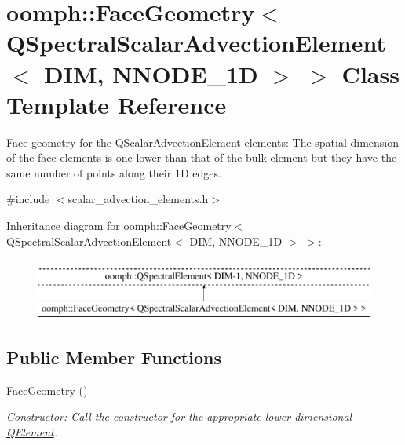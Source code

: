 \hypertarget{classoomph_1_1FaceGeometry_3_01QSpectralScalarAdvectionElement_3_01DIM_00_01NNODE__1D_01_4_01_4}{}\section{oomph\+:\+:Face\+Geometry$<$ Q\+Spectral\+Scalar\+Advection\+Element$<$ D\+IM, N\+N\+O\+D\+E\+\_\+1D $>$ $>$ Class Template Reference}
\label{classoomph_1_1FaceGeometry_3_01QSpectralScalarAdvectionElement_3_01DIM_00_01NNODE__1D_01_4_01_4}


Face geometry for the \hyperlink{classoomph_1_1QScalarAdvectionElement}{Q\+Scalar\+Advection\+Element} elements\+: The spatial dimension of the face elements is one lower than that of the bulk element but they have the same number of points along their 1D edges.  




{\ttfamily \#include $<$scalar\+\_\+advection\+\_\+elements.\+h$>$}

Inheritance diagram for oomph\+:\+:Face\+Geometry$<$ Q\+Spectral\+Scalar\+Advection\+Element$<$ D\+IM, N\+N\+O\+D\+E\+\_\+1D $>$ $>$\+:\begin{figure}[H]
\begin{center}
\leavevmode
\includegraphics[height=2.000000cm]{classoomph_1_1FaceGeometry_3_01QSpectralScalarAdvectionElement_3_01DIM_00_01NNODE__1D_01_4_01_4}
\end{center}
\end{figure}
\subsection*{Public Member Functions}
\begin{DoxyCompactItemize}
\item 
\hyperlink{classoomph_1_1FaceGeometry_3_01QSpectralScalarAdvectionElement_3_01DIM_00_01NNODE__1D_01_4_01_4_a2a40a86785381e67e1e5af8e1bbdc194}{Face\+Geometry} ()
\begin{DoxyCompactList}\small\item\em Constructor\+: Call the constructor for the appropriate lower-\/dimensional \hyperlink{classoomph_1_1QElement}{Q\+Element}. \end{DoxyCompactList}\end{DoxyCompactItemize}


